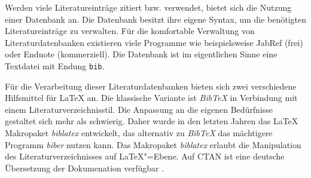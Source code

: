 Werden viele Literatureinträge zitiert bzw. verwendet, bietet sich die Nutzung
einer Datenbank an. Die Datenbank besitzt ihre eigene Syntax,
um die benötigten Literatureinträge zu verwalten. Für die komfortable Verwaltung
von Literaturdatenbanken existieren viele Programme wie beispielsweise JabRef (frei) oder
Endnote (kommerziell). Die Datenbank ist im eigentlichen Sinne eine Textdatei mit
Endung \lstinline|bib|.


Für die Verarbeitung dieser Literaturdatenbanken bieten sich zwei verschiedene
Hilfsmittel für \LaTeX{} an. Die klassische Variante ist \emph{Bib\TeX} in Verbindung
mit einem Literaturverzeichnisstil. Die Anpassung an die eigenen Bedürfnisse
gestaltet sich mehr als schwierig. Daher wurde in den letzten Jahren das \LaTeX{}
Makropaket \emph{biblatex} entwickelt, das alternativ zu \emph{Bib\TeX} das mächtigere
Programm \emph{biber} nutzen kann. Das Makropaket \emph{biblatex} erlaubt die Manipulation
des Literaturverzeichnisses auf \LaTeX"=Ebene. Auf CTAN ist eine deutsche Übersetzung der Dokumenation
verfügbar \cite{biblatex-de}.

\endinput
